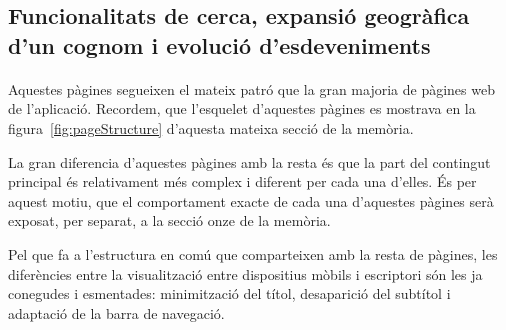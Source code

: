 \subsection{Funcionalitats de cerca, expansió geogràfica d'un cognom i evolució d'esdeveniments}

    \paragraph{}
    Aquestes pàgines segueixen el mateix patró que la gran majoria de pàgines web de l’aplicació. Recordem, que l'esquelet d’aquestes pàgines es mostrava en la figura~\ref{fig:pageStructure} d'aquesta mateixa secció de la memòria.

    La gran diferencia d'aquestes pàgines amb la resta és que la part del contingut principal és relativament més complex i diferent per cada una d'elles. És per aquest motiu, que el comportament exacte de cada una d'aquestes pàgines serà exposat, per separat, a la secció onze de la memòria.

    Pel que fa a l'estructura en comú que comparteixen amb la resta de pàgines, les diferències entre la visualització entre dispositius mòbils i escriptori són les ja conegudes i esmentades: minimització del títol, desaparició del subtítol i adaptació de la barra de navegació.

